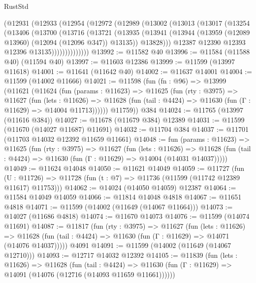 \begin{lexlean}{RustStd}
\begin{coremodule}
        (@12931
          (@12933
            (@12954
              (@12972
                (@12989
                  (@13002
                    (@13013
                      (@13017
                        (@13254
                          (@13406
                            (@13700
                              (@13716
                                (@13721
                                  (@13935
                                    (@13941
                                      (@13944
                                        (@13959 (@12089 @13960) (@12094 (@12096 @347)) @13135))
                                      @13828)))
                                @12387
                                @12390
                                @12393
                                @12396
                                @13135))))))))))))))
@13992 := @11582 @40
@13996 := @11584 (@11588 @40) (@11594 @40)
@13997 := @11603 @12386
@13999 := @11599 (@13997 @11618)
@14001 := @11641 (@11642 @40)
@14002 := @11637 @14001
@14004 := @11599 (@14002 @11666)
@14021 := @11598
    (fun (fn : @96) =>
    @13999
      (@11621
        (@11624
          (fun (params : @11623) =>
          @11625
            (fun (rty : @3975) =>
            @11627
              (fun (lets : @11626) =>
              @11628 (fun (tail : @4424) => @11630 (fun (Γ : @11629) => @14004 @11713))))))
        @11759))
    @384
@14024 := @11765 (@13997 (@11616 @384))
@14027 := @11678 (@11679 @384) @12389
@14031 := @11599 (@11670 (@14027 @11687) @11691)
@14032 := @11704 @384
@14037 := @11701 (@11703 @14032 @12392 @11659 @11661)
@14048 := fun (params : @11623) =>
  @11625
    (fun (rty : @3975) =>
    @11627
      (fun (lets : @11626) =>
      @11628 (fun (tail : @4424) => @11630 (fun (Γ : @11629) => @14004 (@14031 @14037)))))
@14049 := @11624 @14048
@14050 := @11621 @14049
@14059 := @11727
    (fun (U : @11726) => @11728 (fun (t : @7) => @11736 (@11599 (@11742 @12389 @11617) @11753)))
@14062 := @14024 (@14050 @14059) @12387
@14064 := @11584 @14049 @14059
@14066 := @11814 @14048 @4818
@14067 := @11651 @4818
@14071 := @11599 (@14002 (@11649 (@14067 @11664)))
@14073 := @14027 (@11686 @4818)
@14074 := @11670 @14073
@14076 := @11599 (@14074 @11691)
@14087 := @11817
    (fun (rty : @3975) =>
    @11627
      (fun (lets : @11626) =>
      @11628 (fun (tail : @4424) => @11630 (fun (Γ : @11629) => @14071 (@14076 @14037)))))
    @4091
@14091 := @11599 (@14002 (@11649 (@14067 @12710)))
@14093 := @12717 @14032 @12392
@14105 := @11839
    (fun (lets : @11626) =>
    @11628
      (fun (tail : @4424) =>
      @11630 (fun (Γ : @11629) => @14091 (@14076 (@12716 (@14093 @11659 @11661))))))

\end{coremodule}
\end{lexlean}
